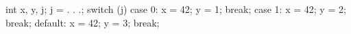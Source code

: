 int x, y, j;
j = . . .;
switch (j) {
    case  0: x = 42; y = 1; break;
    case  1: x = 42; y = 2; break;
    default: x = 42; y = 3; break;
}